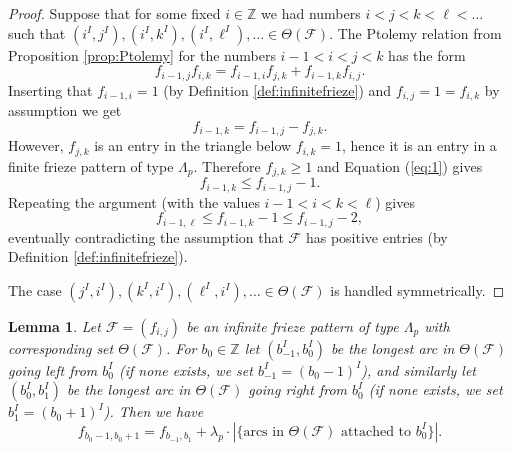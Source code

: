 \documentclass[11pt,a4paper]{amsart}
\newtheorem{Lemma}{Lemma}[section]
\theoremstyle{definition}
\numberwithin{equation}{section}
\begin{document}
\begin{proof}
Suppose that for some fixed $i\in \mathbb{Z}$ we had numbers $i<j<k<\ell<\ldots$ such that 
$(i^I,j^I),(i^I,k^I),(i^I,\ell^I),\ldots\in \Theta(\mathcal{F})$. The Ptolemy relation from 
Proposition \ref{prop:Ptolemy} for the numbers $i-1<i<j<k$ has the form
$$f_{i-1,j}f_{i,k} = f_{i-1,i}f_{j,k} + f_{i-1,k}f_{i,j}.
$$
Inserting that $f_{i-1,i}=1$ (by Definition \ref{def:infinitefrieze}) and $f_{i,j}=1=f_{i,k}$ by assumption 
we get
\begin{equation} \label{eq:1}
f_{i-1,k} = f_{i-1,j} - f_{j,k}.
\end{equation}
However, $f_{j,k}$ is an entry in the triangle below $f_{i,k}=1$, hence it is an entry in a finite 
frieze pattern of type $\Lambda_p$. Therefore $f_{j,k}\ge 1$ and Equation (\ref{eq:1}) gives
$$f_{i-1,k} \le f_{i-1,j}-1.
$$ 
Repeating the argument (with the values $i-1<i<k<\ell$) gives
$$f_{i-1,\ell} \le f_{i-1,k}-1 \le f_{i-1,j}-2,
$$ 
eventually contradicting the assumption that $\mathcal{F}$ has positive entries (by Definition \ref{def:infinitefrieze}). 
\smallskip

The case $(j^I,i^I),(k^I,i^I),(\ell^I,i^I),\ldots \in \Theta(\mathcal{F})$ is handled
symmetrically. 
\end{proof}


\begin{Lemma} \label{lem:longarcs}
Let $\mathcal{F}=(f_{i,j})$ be an infinite frieze pattern of type $\Lambda_p$ with corresponding set $\Theta(\mathcal{F})$. 
For $b_0\in\mathbb{Z}$ let $(b_{-1}^I,b_0^I)$ be the longest arc in $\Theta(\mathcal{F})$ going left from $b_0^I$
(if none exists, we set $b_{-1}^I=(b_0-1)^I$), and similarly let 
 $(b_{0}^I,b_1^I)$ be the longest arc in $\Theta(\mathcal{F})$ going right from $b_0^I$
(if none exists, we set $b_{1}^I=(b_0+1)^I$). Then we have
$$f_{b_0-1,b_0+1} = f_{b_{-1},b_1} + \lambda_p\cdot |\{\text{arcs in $\Theta(\mathcal{F})$ attached to $b_0^I$}\}|.
$$
\end{Lemma}
\end{document}

